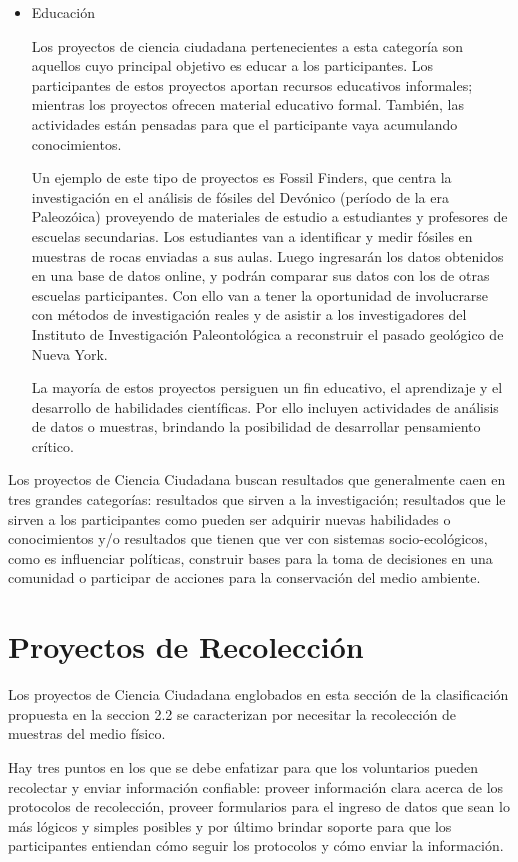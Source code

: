 \begin{itemize}
	\item {Educación} 
	
	Los proyectos de ciencia ciudadana pertenecientes a esta categoría son aquellos cuyo principal objetivo es educar a los participantes. Los participantes de estos proyectos aportan recursos educativos informales; mientras los proyectos ofrecen material educativo formal. También, las actividades están pensadas para que el participante vaya acumulando conocimientos.
	
	Un ejemplo de este tipo de proyectos es Fossil Finders, que centra la investigación en el análisis de fósiles del Devónico (período de la era Paleozóica) proveyendo de materiales de estudio a estudiantes y profesores de escuelas secundarias. Los estudiantes van a identificar y medir fósiles en muestras de rocas enviadas a sus aulas. Luego ingresarán los datos obtenidos en una base de datos online, y podrán comparar sus datos con los de otras escuelas participantes. Con ello van a tener la oportunidad de involucrarse con métodos de investigación reales y de asistir a los investigadores del Instituto de Investigación Paleontológica a reconstruir el pasado geológico de Nueva York. \cite{FossilFinders}

	La mayoría de estos proyectos persiguen un fin educativo, el aprendizaje y el desarrollo de habilidades científicas. Por ello incluyen actividades de análisis de datos o muestras, brindando la posibilidad de desarrollar pensamiento crítico. 
	\end{itemize} 
	
	Los proyectos de Ciencia Ciudadana buscan resultados que generalmente caen en tres grandes categorías: resultados que sirven a la investigación; resultados que le sirven a los participantes como pueden ser adquirir nuevas habilidades o conocimientos y/o resultados que tienen que ver con sistemas socio-ecológicos, como es influenciar políticas, construir bases para la toma de decisiones en una comunidad o participar de acciones para la conservación del medio ambiente. \cite{shirk2012public}

\section{Proyectos de Recolección}	 
	Los proyectos de Ciencia Ciudadana englobados en esta sección de la clasificación propuesta en la seccion 2.2 se caracterizan por necesitar la recolección de muestras del medio físico.
	
	Hay tres puntos en los que se debe enfatizar para que los voluntarios pueden recolectar y enviar información confiable: proveer información clara acerca de los protocolos de recolección, proveer formularios para el ingreso de datos que sean lo más lógicos y simples posibles y por último brindar soporte para que los participantes entiendan cómo seguir los protocolos y cómo enviar la información.\cite{bonney2009citizen}

